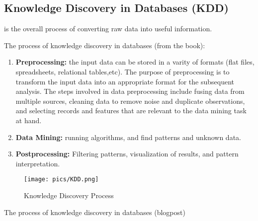 	\subsection*{Knowledge Discovery in Databases (KDD)} is the overall process of converting raw 
	data into useful information. 

	The process of knowledge discovery in databases (from the book):
	\begin{enumerate}
		\item {\bf Preprocessing:} the input data can be stored in a varity of formats (flat files, spreadsheets, relational tables,etc). The purpose of preprocessing is to transform the input data into an appropriate format for the subsequent analysis. The steps involved in data preprocessing include fusing data from multiple sources, cleaning data to remove noise and duplicate observations, and selecting records and features that are relevant to the data mining task at hand. 
		\item {\bf Data Mining:} running algorithms, and find patterns and unknown data.
		\item {\bf Postprocessing:} Filtering patterns, visualization of results, and pattern interpretation. 
	\end{enumerate}

		\begin{figure}[H]
			\texttt{[image: pics/KDD.png]}
			\caption{Knowledge Discovery Process}
		\end{figure}


	\clearpage
	The process of knowledge discovery in databases (blogpost)
		
